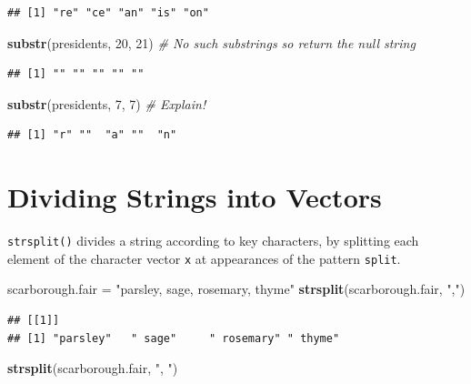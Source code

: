 \documentclass[
]{book}
\newenvironment{Shaded}{\begin{snugshade}}{\end{snugshade}}
\newcommand{\CommentTok}[1]{\textcolor[rgb]{0.56,0.35,0.01}{\textit{#1}}}
\newcommand{\DecValTok}[1]{\textcolor[rgb]{0.00,0.00,0.81}{#1}}
\newcommand{\KeywordTok}[1]{\textcolor[rgb]{0.13,0.29,0.53}{\textbf{#1}}}
\newcommand{\NormalTok}[1]{#1}
\newcommand{\StringTok}[1]{\textcolor[rgb]{0.31,0.60,0.02}{#1}}
\begin{document}
\begin{verbatim}
## [1] "re" "ce" "an" "is" "on"
\end{verbatim}

\begin{Shaded}
\begin{Highlighting}[]
\KeywordTok{substr}\NormalTok{(presidents, }\DecValTok{20}\NormalTok{,}
    \DecValTok{21}\NormalTok{)  }\CommentTok{# No such substrings so return the null string}
\end{Highlighting}
\end{Shaded}

\begin{verbatim}
## [1] "" "" "" "" ""
\end{verbatim}

\begin{Shaded}
\begin{Highlighting}[]
\KeywordTok{substr}\NormalTok{(presidents, }\DecValTok{7}\NormalTok{,}
    \DecValTok{7}\NormalTok{)  }\CommentTok{# Explain!}
\end{Highlighting}
\end{Shaded}

\begin{verbatim}
## [1] "r" ""  "a" ""  "n"
\end{verbatim}

\hypertarget{dividing-strings-into-vectors}{%
\section{Dividing Strings into Vectors}\label{dividing-strings-into-vectors}}

\texttt{strsplit()} divides a string according to key characters, by splitting each element of the character vector \texttt{x} at appearances of the pattern \texttt{split}.

\begin{Shaded}
\begin{Highlighting}[]
\NormalTok{scarborough.fair =}\StringTok{ "parsley, sage, rosemary, thyme"}
\KeywordTok{strsplit}\NormalTok{(scarborough.fair,}
    \StringTok{","}\NormalTok{)}
\end{Highlighting}
\end{Shaded}

\begin{verbatim}
## [[1]]
## [1] "parsley"   " sage"     " rosemary" " thyme"
\end{verbatim}

\begin{Shaded}
\begin{Highlighting}[]
\KeywordTok{strsplit}\NormalTok{(scarborough.fair,}
    \StringTok{", "}\NormalTok{)}
\end{Highlighting}
\end{Shaded}
\end{document}
